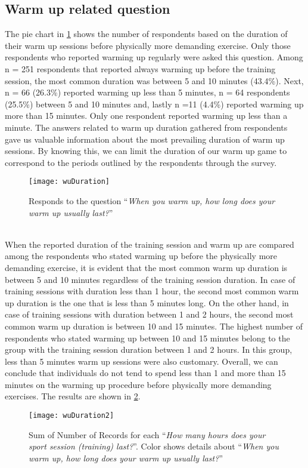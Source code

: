 \subsection{Warm up related question}
The pie chart in \ref{fig:wuDuration} shows the number of respondents based on the duration of their warm up sessions before physically more demanding exercise. Only those respondents who reported warming up regularly were asked this question. Among n = 251 respondents that reported always warming up before the training session, the most common duration was between 5 and 10 minutes (43.4\%). Next, n = 66 (26.3\%) reported warming up less than 5 minutes, n = 64 respondents (25.5\%) between 5 and 10 minutes and, lastly n =11 (4.4\%) reported warming up more than 15 minutes. Only one respondent reported warming up less than a minute. The answers related to warm up duration gathered from respondents gave us valuable information about the most prevailing duration of warm up sessions. By knowing this, we can limit the duration of our warm up game to correspond to the periods outlined by the respondents through the survey.   
\begin{figure}[h]
    \centering
    \texttt{[image: wuDuration]}
    \caption{ Responds to the question ``\textit{When you warm up, how long does your warm up usually last?}''}
    \label{fig:wuDuration}
\end{figure}\\
When the reported duration of the training session and warm up are compared among the respondents who stated warming up before the physically more demanding exercise, it is evident that the most common warm up duration is between 5 and 10 minutes regardless of the training session duration. In case of training sessions with duration less than 1 hour, the second most common warm up duration is the one that is less than 5 minutes long. On the other hand, in case of training sessions with duration between 1 and 2 hours, the second most common warm up duration is between 10 and 15 minutes. The highest number of respondents who stated warming up between 10 and 15 minutes belong to the group with the training session duration between 1 and 2 hours. In this group, less than 5 minutes warm up sessions were also customary. Overall, we can conclude that individuals do not tend to spend less than 1 and more than 15 minutes on the warming up procedure before physically more demanding exercises. The results are shown in \ref{fig:wuDuration2}.\\
\begin{figure}[h]
    \centering
    \texttt{[image: wuDuration2]}
    \caption{Sum of Number of Records for each ``\textit{How many hours does your sport session (training) last?}''. Color shows details about ``\textit{When you warm up, how long does your warm up usually last?}''}
    \label{fig:wuDuration2}
\end{figure}\\
